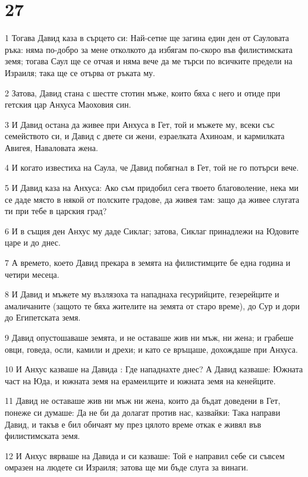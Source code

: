 \chapter{27}

\par 1 Тогава Давид каза в сърцето си: Най-сетне ще загина един ден от Сауловата ръка: няма по-добро за мене отколкото да избягам по-скоро във филистимската земя; тогава Саул ще се отчая и няма вече да ме търси по всичките предели на Израиля; така ще се отърва от ръката му.
\par 2 Затова, Давид стана с шестте стотин мъже, които бяха с него и отиде при гетския цар Анхуса Маоховия син.
\par 3 И Давид остана да живее при Анхуса в Гет, той и мъжете му, всеки със семейството си, и Давид с двете си жени, езраелката Ахиноам, и кармилката Авигея, Наваловата жена.
\par 4 И когато известиха на Саула, че Давид побягнал в Гет, той не го потърси вече.
\par 5 И Давид каза на Анхуса: Ако съм придобил сега твоето благоволение, нека ми се даде място в някой от полските градове, да живея там: защо да живее слугата ти при тебе в царския град?
\par 6 И в същия ден Анхус му даде Сиклаг; затова, Сиклаг принадлежи на Юдовите царе и до днес.
\par 7 А времето, което Давид прекара в земята на филистимците бе една година и четири месеца.
\par 8 И Давид и мъжете му възлязоха та нападнаха гесурийците, гезерейците и амаличаните (защото те бяха жителите на земята от старо време), до Сур и дори до Египетската земя.
\par 9 Давид опустошаваше земята, и не оставаше жив ни мъж, ни жена; и грабеше овци, говеда, осли, камили и дрехи; и като се връщаше, дохождаше при Анхуса.
\par 10 И Анхус казваше на Давида : Где нападнахте днес? А Давид казваше: Южната част на Юда, и южната земя на ерамеилците и южната земя на кенейците.
\par 11 Давид не оставаше жив ни мъж ни жена, които да бъдат доведени в Гет, понеже си думаше: Да не би да долагат против нас, казвайки: Така направи Давид, и такъв е бил обичаят му през цялото време откак е живял във филистимската земя.
\par 12 И Анхус вярваше на Давида и си казваше: Той е направил себе си съвсем омразен на людете си Израиля; затова ще ми бъде слуга за винаги.

